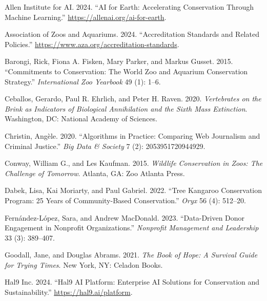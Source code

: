 \documentclass[
  Letterpaper,
]{scrbook}
\newlength{\cslhangindent}
\newenvironment{CSLReferences}[2] %
 {\begin{list}{}{%
  \setlength{\itemindent}{0pt}
  \setlength{\leftmargin}{0pt}
  \setlength{\parsep}{0pt}
  \ifodd #1
   \setlength{\leftmargin}{\cslhangindent}
   \setlength{\itemindent}{-1\cslhangindent}
  \fi
  \setlength{\itemsep}{#2\baselineskip}}}
 {\end{list}}
\begin{document}

\label{refs}
\begin{CSLReferences}{1}{0}
Allen Institute for AI. 2024. {``AI for Earth: Accelerating Conservation
Through Machine Learning.''} \url{https://allenai.org/ai-for-earth}.

Association of Zoos and Aquariums. 2024. {``Accreditation Standards and
Related Policies.''} \url{https://www.aza.org/accreditation-standards}.

Barongi, Rick, Fiona A. Fisken, Mary Parker, and Markus Gusset. 2015.
{``Commitments to Conservation: The World Zoo and Aquarium Conservation
Strategy.''} \emph{International Zoo Yearbook} 49 (1): 1--6.

Ceballos, Gerardo, Paul R. Ehrlich, and Peter H. Raven. 2020.
\emph{Vertebrates on the Brink as Indicators of Biological Annihilation
and the Sixth Mass Extinction}. Washington, DC: National Academy of
Sciences.

Christin, Angèle. 2020. {``Algorithms in Practice: Comparing Web
Journalism and Criminal Justice.''} \emph{Big Data \& Society} 7 (2):
2053951720944929.

Conway, William G., and Les Kaufman. 2015. \emph{Wildlife Conservation
in Zoos: The Challenge of Tomorrow}. Atlanta, GA: Zoo Atlanta Press.

Dabek, Lisa, Kai Moriarty, and Paul Gabriel. 2022. {``Tree Kangaroo
Conservation Program: 25 Years of Community-Based Conservation.''}
\emph{Oryx} 56 (4): 512--20.

Fernández-López, Sara, and Andrew MacDonald. 2023. {``Data-Driven Donor
Engagement in Nonprofit Organizations.''} \emph{Nonprofit Management and
Leadership} 33 (3): 389--407.

Goodall, Jane, and Douglas Abrams. 2021. \emph{The Book of Hope: A
Survival Guide for Trying Times}. New York, NY: Celadon Books.

Hal9 Inc. 2024. {``Hal9 AI Platform: Enterprise AI Solutions for
Conservation and Sustainability.''} \url{https://hal9.ai/platform}.


\end{CSLReferences}
\end{document}
